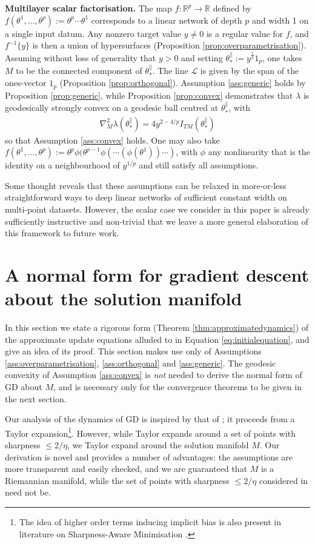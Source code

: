 \documentclass{article}
\newcommand{\myparagraph}[1]{\noindent\textbf{#1.}}
\newcommand{\RB}{\mathbb{R}}
\newcommand{\tpa}{\theta^{\parallel}}
\theoremstyle{plain}
\theoremstyle{definition}
\theoremstyle{remark}
\begin{document}
\myparagraph{Multilayer scalar factorisation} The map $f:\RB^p\rightarrow\RB$ defined by $f(\theta^1,\dots,\theta^p):=\theta^p\cdots\theta^1$ corresponds to a linear network of depth $p$ and width 1 on a single input datum. Any nonzero target value $y\neq0$ is a regular value for $f$, and $f^{-1}\{y\}$ is then a union of hypersurfaces (Proposition \ref{prop:overparametrisation}). Assuming without loss of generality that $y>0$ and setting $\theta^{\parallel}_*:=y^{\frac{1}{p}}1_p$, one takes $M$ to be the connected component of $\theta^{\parallel}_*$. The line $\mathcal{L}$ is given by the span of the ones-vector $1_p$ (Proposition \ref{prop:orthogonal}). Assumption \ref{ass:generic} holds by Proposition \ref{prop:generic}, while Proposition \ref{prop:convex} demonstrates that $\lambda$ is geodesically strongly convex on a geodesic ball centred at $\tpa_*$, with
\begin{align}
    \nabla^2_M\lambda(\tpa_*) = 4y^{2-4/p}I_{TM}(\tpa_*)
\end{align}
so that Assumption \ref{ass:convex} holds. One may also take $f(\theta^1,\dots,\theta^p):=\theta^p\phi(\theta^{p-1}\phi(\cdots(\phi(\theta^1))\cdots)$, with $\phi$ any nonlinearity that is the identity on a neighbourhood of $y^{1/p}$ and still satisfy all assumptions.

Some thought reveals that these assumptions can be relaxed in more-or-less straightforward ways to deep linear networks of sufficient constant width on multi-point datasets. However, the scalar case we consider in this paper is already sufficiently instructive and non-trivial that we leave a more general elaboration of this framework to future work.

\section{A normal form for gradient descent about the solution manifold}

In this section we state a rigorous form (Theorem \ref{thm:approximatedynamics}) of the approximate update equations alluded to in Equation \eqref{eq:initialequation}, and give an idea of its proof. This section makes use only of Assumptions \ref{ass:overparametrisation}, \ref{ass:orthogonal} and \ref{ass:generic}. The geodesic convexity of Assumption \ref{ass:convex} is \emph{not} needed to derive the normal form of GD about $M$, and is necessary only for the convergence theorems to be given in the next section.
%

Our analysis of the dynamics of GD is inspired by that of \cite{damianeos}; it proceeds from a Taylor expansion\footnote{The idea of higher order terms inducing implicit bias is also present in literature on Sharpness-Aware Minimisation \cite{bartlettsam}.}. However, while \cite{damianeos} Taylor expands around a set of points with sharpness $\leq 2/\eta$, we Taylor expand around the solution manifold $M$. Our derivation is novel and provides a number of advantages: the assumptions are more transparent and easily checked, and we are guaranteed that $M$ is a Riemannian manifold, while the set of points with sharpness $\leq 2/\eta$ considered in \cite{damianeos} need not be. 
\end{document}
